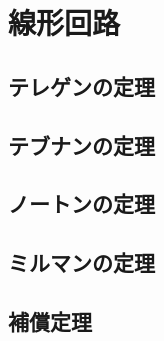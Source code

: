 \section{線形回路}
    \subsection{テレゲンの定理}
    \subsection{テブナンの定理}
    \subsection{ノートンの定理}
    \subsection{ミルマンの定理}
    \subsection{補償定理}